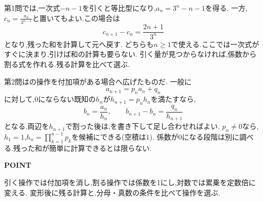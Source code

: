 第1問では,一次式$-n-1$を引くと等比型になり,$a_n=3^n-n-1$を得る.
一方,$c_n=\frac{a_n}{3^{n-1}}$と置いてもよい.この場合は
\[
  c_{n+1}-c_n=\frac{2n+1}{3^n}
\]
となり,残った和を計算して元へ戻す.
どちらも$n\ge1$で使える.ここでは一次式がすぐに決まり,引けば和の計算も要らない.
引く量が見つからなければ,係数から割る式を作れる.残る計算を比べて選ぶ.

第2問はの操作を付加項がある場合へ広げたものだ.
一般に
\[
  a_{n+1}=p_na_n+q_n
\]
に対して,0にならない既知の$h_n$が$h_{n+1}=p_nh_n$を満たすなら,
\[
  b_n=\frac{a_n}{h_n},\qquad
  b_{n+1}-b_n=\frac{q_n}{h_{n+1}}
\]
となる.両辺を$h_{n+1}$で割った後は,を書き下して足し合わせればよい.
$p_n\ne0$なら,$h_1=1$,$h_n=\prod_{k=1}^{n-1}p_k$を候補にできる(空積は$1$).
係数が0になる段階は別に調べる.残った和が簡単に計算できるとは限らない.

\begin{bookpoint}
  \textbf{POINT}\par
  引く操作では付加項を消し,割る操作では係数を1にし,対数では累乗を定数倍に変える.
  変形後に残る計算と,分母・真数の条件を比べて操作を選ぶ.
\end{bookpoint}
